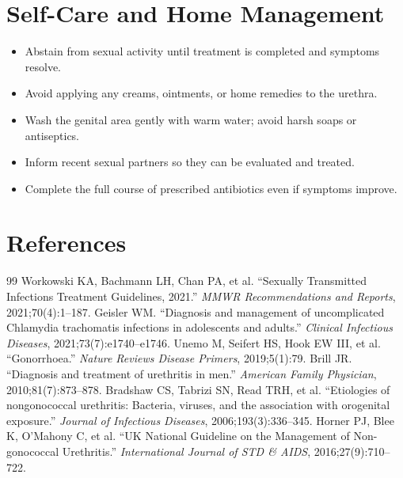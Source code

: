\section*{Self-Care and Home Management}
\begin{itemize}
  \item Abstain from sexual activity until treatment is completed and symptoms resolve.
  \item Avoid applying any creams, ointments, or home remedies to the urethra.
  \item Wash the genital area gently with warm water; avoid harsh soaps or antiseptics.
  \item Inform recent sexual partners so they can be evaluated and treated.
  \item Complete the full course of prescribed antibiotics even if symptoms improve.
\end{itemize}

\section*{References}
\begin{thebibliography}{99}
 Workowski KA, Bachmann LH, Chan PA, et al. ``Sexually Transmitted Infections Treatment Guidelines, 2021.'' \textit{MMWR Recommendations and Reports}, 2021;70(4):1--187.
 Geisler WM. ``Diagnosis and management of uncomplicated Chlamydia trachomatis infections in adolescents and adults.'' \textit{Clinical Infectious Diseases}, 2021;73(7):e1740--e1746.
 Unemo M, Seifert HS, Hook EW III, et al. ``Gonorrhoea.'' \textit{Nature Reviews Disease Primers}, 2019;5(1):79.
 Brill JR. ``Diagnosis and treatment of urethritis in men.'' \textit{American Family Physician}, 2010;81(7):873--878.
 Bradshaw CS, Tabrizi SN, Read TRH, et al. ``Etiologies of nongonococcal urethritis: Bacteria, viruses, and the association with orogenital exposure.'' \textit{Journal of Infectious Diseases}, 2006;193(3):336--345.
 Horner PJ, Blee K, O'Mahony C, et al. ``UK National Guideline on the Management of Non-gonococcal Urethritis.'' \textit{International Journal of STD \& AIDS}, 2016;27(9):710--722.
\end{thebibliography}
